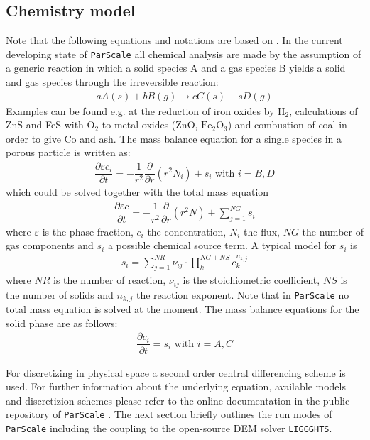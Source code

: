 \documentclass{particles2015}
\begin{document}
\subsection{Chemistry model}
Note that the following equations and notations are based on \cite{Noorman2011}. In the current developing state of \texttt{ParScale} all chemical analysis are made by the assumption of a generic reaction in which a solid species A and a gas species B yields a solid and gas species through the irreversible reaction:
\begin{align}
a A (s) + bB (g) \rightarrow cC(s) + sD(g)
\end{align}
Examples can be found e.g. at the reduction of iron oxides by $\text{H}_2$, calculations of ZnS and FeS with $\text{O}_2$ to metal oxides (ZnO, $\text{Fe}_2\text{O}_3$) and combustion of coal in order to give Co and ash. The mass balance equation for a single species in a porous particle is written as:
\begin{align}
\dfrac{\partial \varepsilon c_i}{\partial t} = - \dfrac{1}{r^2} \dfrac{\partial}{\partial r } (r^2 N_i) + s_i \text{ with } i = B, D
\end{align}
which could be solved together with the total mass equation
\begin{align}
\dfrac{\partial \varepsilon c}{\partial t} = - \dfrac{1}{r^2} \dfrac{\partial}{\partial r } (r^2 N) + \sum\limits_{j=1}^{NG} s_i
\label{eqn:total_concentration}
\end{align}
where $\varepsilon$ is the phase fraction, $c_i$ the concentration, $N_i$ the flux, $NG$ the number of gas components and $s_i$ a possible chemical source term. A typical model for $s_i$ is
\begin{align}
s_i = \sum\limits_{j=1}^{NR} \nu_{ij} \cdot \prod\limits_k^{NG+NS} c_k^{n_{k,j}}
\end{align} 
where $NR$ is the number of reaction, $\nu_{ij}$ is the stoichiometric coefficient, $NS$ is the number of solids and $n_{k,j}$ the reaction exponent. Note that in \texttt{ParScale} no total mass equation is solved at the moment. The mass balance equations for the solid phase are as follows:
\begin{align}
\dfrac{\partial c_i}{\partial t} = s_i \text{ with } i = A, C
\end{align}


For discretizing in physical space a second order central differencing scheme is used. For further information about the underlying equation, available models and discretizion schemes please refer to the online documentation in the public repository of \texttt{ParScale} \cite{ParScale_Public}. The next section briefly outlines the run modes of \texttt{ParScale} including the coupling to the open-source DEM solver \texttt{LIGGGHTS}\textregistered.
\end{document}
